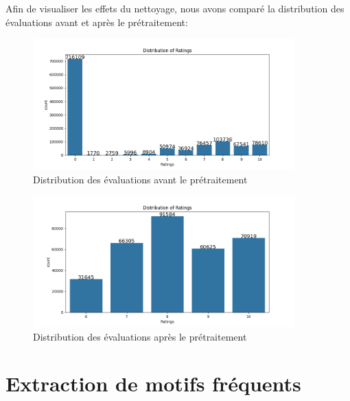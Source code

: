 \documentclass[a4paper, 12pt]{article}
\begin{document}
\vspace{0.5cm}
Afin de visualiser les effets du nettoyage, nous avons comparé la distribution des évaluations avant et après le prétraitement:


\begin{figure}[H]
    \centering
    \includegraphics[width=0.9\textwidth]{distribution_of_ratings_before.png} %
    \caption{Distribution des évaluations avant le prétraitement}
    \label{fig:mon_image}
\end{figure}


\begin{figure}[H]
    \centering
    \includegraphics[width=0.9\textwidth]{distribution_of_ratings_after.png} %
    \caption{Distribution des évaluations après le prétraitement}
    \label{fig:mon_image}
\end{figure}



\newpage
\pagestyle{fancy}
\section{Extraction de motifs fréquents}
\justifying 
\end{document}
